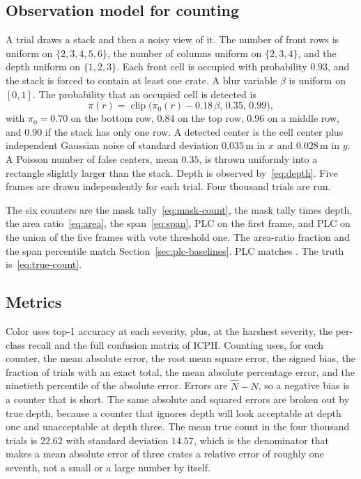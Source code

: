 \subsection{Observation model for counting}
\label{sec:count-model}

A trial draws a stack and then a noisy view of it. The number of front rows is uniform on $\{2,3,4,5,6\}$, the number of columns uniform on $\{2,3,4\}$, and the depth uniform on $\{1,2,3\}$. Each front cell is occupied with probability $0.93$, and the stack is forced to contain at least one crate. A blur variable $\beta$ is uniform on $[0,1]$. The probability that an occupied cell is detected is
\begin{equation}
\pi(r)
= \operatorname{clip}\!\big(\pi_0(r)-0.18\,\beta,\, 0.35,\, 0.99\big),
\label{eq:detprob}
\end{equation}
with $\pi_0=0.70$ on the bottom row, $0.84$ on the top row, $0.96$ on a middle row, and $0.90$ if the stack has only one row. A detected center is the cell center plus independent Gaussian noise of standard deviation $0.035\,\mathrm{m}$ in $x$ and $0.028\,\mathrm{m}$ in $y$. A Poisson number of false centers, mean $0.35$, is thrown uniformly into a rectangle slightly larger than the stack. Depth is observed by~\eqref{eq:depth}. Five frames are drawn independently for each trial. Four thousand trials are run.

The six counters are the mask tally~\eqref{eq:mask-count}, the mask tally times depth, the area ratio~\eqref{eq:area}, the span~\eqref{eq:span}, PLC on the first frame, and PLC on the union of the five frames with vote threshold one. The area-ratio fraction and the span percentile match Section~\ref{sec:plc-baselines}. PLC matches . The truth is~\eqref{eq:true-count}.

\subsection{Metrics}
\label{sec:est-metrics}

Color uses top-1 accuracy at each severity, plus, at the harshest severity, the per-class recall and the full confusion matrix of ICPH. Counting uses, for each counter, the mean absolute error, the root mean square error, the signed bias, the fraction of trials with an exact total, the mean absolute percentage error, and the ninetieth percentile of the absolute error. Errors are $\hat{N}-N$, so a negative bias is a counter that is short. The same absolute and squared errors are broken out by true depth, because a counter that ignores depth will look acceptable at depth one and unacceptable at depth three. The mean true count in the four thousand trials is $22.62$ with standard deviation $14.57$, which is the denominator that makes a mean absolute error of three crates a relative error of roughly one seventh, not a small or a large number by itself.


